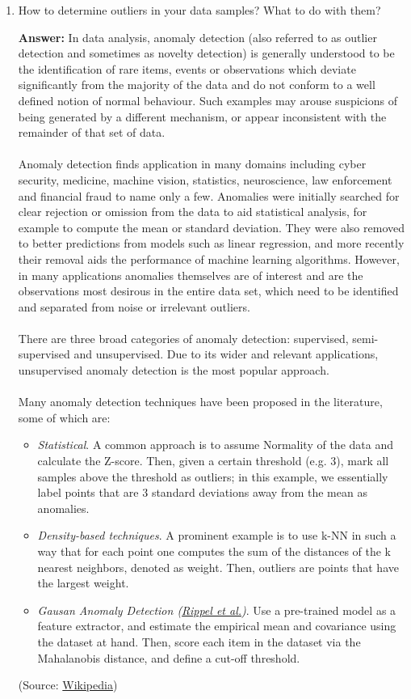 \documentclass{article}
\newenvironment{QandA}{\begin{enumerate}[label=\arabic*.]}{\end{enumerate}}
\newenvironment{answer}{\par\normalfont \textbf{Answer:}}{}
\begin{document}
\begin{QandA}
    \item How to determine outliers in your data samples? What to do with them?
    \begin{answer}
        In data analysis, anomaly detection (also referred to as outlier detection and sometimes as novelty detection) is generally understood to be the identification of rare items, events or observations which deviate significantly from the majority of the data and do not conform to a well defined notion of normal behaviour. Such examples may arouse suspicions of being generated by a different mechanism, or appear inconsistent with the remainder of that set of data. \\\\
        Anomaly detection finds application in many domains including cyber security, medicine, machine vision, statistics, neuroscience, law enforcement and financial fraud to name only a few. Anomalies were initially searched for clear rejection or omission from the data to aid statistical analysis, for example to compute the mean or standard deviation. They were also removed to better predictions from models such as linear regression, and more recently their removal aids the performance of machine learning algorithms. However, in many applications anomalies themselves are of interest and are the observations most desirous in the entire data set, which need to be identified and separated from noise or irrelevant outliers. \\\\
        There are three broad categories of anomaly detection: supervised, semi-supervised and unsupervised. Due to its wider and relevant applications, unsupervised anomaly detection is the most popular approach. \\\\
        Many anomaly detection techniques have been proposed in the literature, some of which are:
        \begin{itemize}
            \item \textit{Statistical}. A common approach is to assume Normality of the data and calculate the Z-score. Then, given a certain threshold (e.g. 3), mark all samples above the threshold as outliers; in this example, we essentially label points that are 3 standard deviations away from the mean as anomalies. 
            \item \textit{Density-based techniques}. A prominent example is to use k-NN in such a way that for each point one computes the sum of the distances of the k nearest neighbors, denoted as weight. Then, outliers are points that have the largest weight. 
            \item \textit{Gausan Anomaly Detection (\href{https://ieeexplore.ieee.org/document/9493210}{Rippel et al.})}. Use a pre-trained model as a feature extractor, and estimate the empirical mean and covariance using the dataset at hand. Then, score each item in the dataset via the Mahalanobis distance, and define a cut-off threshold. 
        \end{itemize}
        (Source: \href{https://en.wikipedia.org/wiki/Anomaly_detection}{Wikipedia})
    \end{answer}


\end{QandA}
\end{document}
